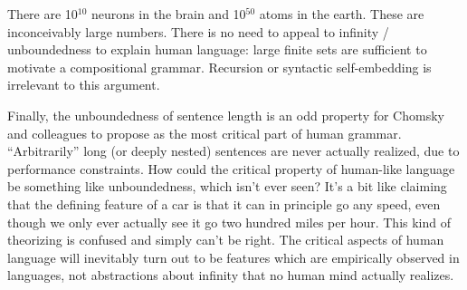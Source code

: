 \documentclass{article}
\begin{document}
There are 10$^{10}$ neurons in the brain and 10$^{50}$ atoms in the earth. These are inconceivably large numbers. There is no need to appeal to infinity / unboundedness to explain human language: large finite sets are sufficient to motivate a compositional grammar. Recursion or syntactic self-embedding is irrelevant to this argument.

Finally, the unboundedness of sentence length is an odd property for Chomsky and colleagues to propose as the most critical part of human grammar.  ``Arbitrarily'' long (or deeply nested) sentences are never actually realized, due to performance constraints. How could the critical property of human-like language be something like unboundedness, which isn’t ever seen? It's a bit like claiming that the defining feature of a car is that it can in principle go any speed, even though we only ever actually see it go two hundred miles per hour. This kind of theorizing is confused and simply can't be right. The critical aspects of human language will inevitably turn out to be features which are empirically observed in languages, not abstractions about infinity that no human mind actually realizes.

\printbibliography[heading=subbibliography,notkeyword=this]
\end{document}
